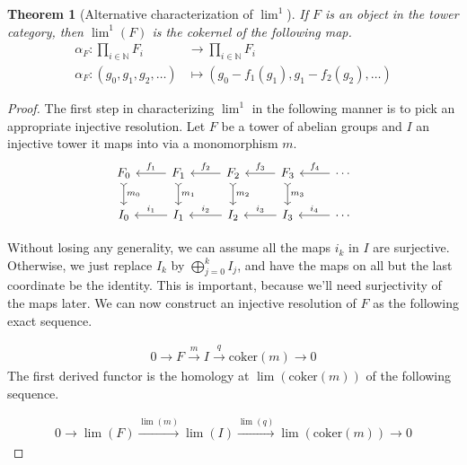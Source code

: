 \documentclass[12pt, notitlepage]{article}
\newtheorem{thm}{Theorem}[section]
\theoremstyle{definition}
\newcommand{\coker}{\mathrm{coker}}
\begin{document}

\begin{thm}[Alternative characterization of $\lim^1$]\label{thm-lim1} 
  If $F$ is an object in the tower category, then $\lim^1(F)$ is the cokernel of the following map.
  \begin{align*}
    \alpha_F : \prod_{i \in \mathbb{N}} F_i &\to \prod_{i \in \mathbb{N}} F_i \\
    \alpha_F : (g_0, g_1, g_2, \ldots) &\mapsto \left(g_0 - f_1(g_1), g_1 - f_2(g_2), \ldots \right)
  \end{align*}
\end{thm}

\begin{proof}
  The first step in characterizing ${\lim}^1$ in the following manner is to pick an appropriate
  injective resolution. Let $F$ be a tower of abelian groups and $I$ an injective tower it maps into
  via a monomorphism $m$.
  \[
    \begin{tikzcd}
      F_0 \ar[d, rightarrowtail, "m_0"] & F_1 \ar[swap]{l}{f_1} \ar[d, rightarrowtail, "m_1"] & F_2 \ar[swap]{l}{f_2} \ar[d, rightarrowtail, "m_2"] & F_3 \ar[swap]{l}{f_3} \ar[d, rightarrowtail, "m_3"] & \cdots \ar[swap]{l}{f_4} \\
      I_0 & I_1 \ar[swap]{l}{i_1} & I_2 \ar[swap]{l}{i_2} & I_3 \ar[swap]{l}{i_3} & \cdots
      \ar[swap]{l}{i_4}
    \end{tikzcd}
  \]

  Without losing any generality, we can assume all the maps $i_k$ in $I$ are surjective. Otherwise,
  we just replace $I_k$ by $\bigoplus_{j=0}^k I_j$, and have the maps on all but the last coordinate
  be the identity.  This is important, because we'll need surjectivity of the maps later. We can now
  construct an injective resolution of $F$ as the following exact sequence.

\begin{align*}
  0 \xrightarrow{} F \xrightarrow{m} I \xrightarrow{q} \coker(m) \xrightarrow{} 0
\end{align*}
The first derived functor is the homology at $\lim(\coker(m))$ of the following sequence.

\begin{align*}
  0 \xrightarrow{} \lim(F) \xrightarrow{\lim(m)} \lim(I) \xrightarrow{\lim(q)} \lim(\coker(m)) \xrightarrow{} 0
\end{align*}


\end{proof}
\end{document}
